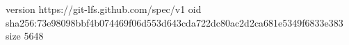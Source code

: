 version https://git-lfs.github.com/spec/v1
oid sha256:73e98098bbf4b074469f06d553d643cda722dc80ac2d2ca681e5349f6833e383
size 5648
